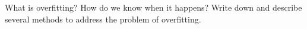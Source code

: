 What is overfitting? How do we know when it happens? Write down and describe several methods to address the problem of overfitting.
